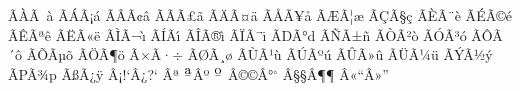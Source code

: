 \def\tura#1{{\edef\scf@{\the\scriptfont\fam}%
 \ifdim\fontdimen6\scf@=0pt\else\scf@\fi $^{\hbox{\b{#1}}}$}}

\ifx\ifmath\undefined
 \def\ifmath$#1${\relax\ifmmode #1\else$#1$\fi} %
\fi

\def\do#1#2{\expandafter\def
 \csname\string^^c2\string#1@tex\endcsname{\string#1}}\doutfA

\def\dotexA{%
 \do^^c3^^80{\`A}\do^^c3^^a0{\`a}%
 \do^^c3^^81{\'A}\do^^c3^^a1{\'a}%
 \do^^c3^^82{\^A}\do^^c3^^a2{\^a}%
 \do^^c3^^83{\~A}\do^^c3^^a3{\~a}%
 \do^^c3^^84{\"A}\do^^c3^^a4{\"a}%
 \do^^c3^^85{\AA}\do^^c3^^a5{\aa}%
 \do^^c3^^86{\AE}\do^^c3^^a6{\ae}%
 \do^^c3^^87{\c C}\do^^c3^^a7{\c c}%
 \do^^c3^^88{\`E}\do^^c3^^a8{\`e}%
 \do^^c3^^89{\'E}\do^^c3^^a9{\'e}%
 \do^^c3^^8a{\^E}\do^^c3^^aa{\^e}%
 \do^^c3^^8b{\"E}\do^^c3^^ab{\"e}%
 \do^^c3^^8c{\`I}\do^^c3^^ac{\`\i}%
 \do^^c3^^8d{\'I}\do^^c3^^ad{\'\i}%
 \do^^c3^^8e{\^I}\do^^c3^^ae{\^\i}%
 \do^^c3^^8f{\"I}\do^^c3^^af{\"\i}%
 \do^^c3^^90{D}\do^^c3^^b0{d}%
 \do^^c3^^91{\~N}\do^^c3^^b1{\~n}%
 \do^^c3^^92{\`O}\do^^c3^^b2{\`o}%
 \do^^c3^^93{\'O}\do^^c3^^b3{\'o}%
 \do^^c3^^94{\^O}\do^^c3^^b4{\^o}%
 \do^^c3^^95{\~O}\do^^c3^^b5{\~o}%
 \do^^c3^^96{\"O}\do^^c3^^b6{\"o}%
 \do^^c3^^97{\ifmath$\times$}\do^^c3^^b7{\ifmath$\div$}%
 \do^^c3^^98{\O}\do^^c3^^b8{\o}%
 \do^^c3^^99{\`U}\do^^c3^^b9{\`u}%
 \do^^c3^^9a{\'U}\do^^c3^^ba{\'u}%
 \do^^c3^^9b{\^U}\do^^c3^^bb{\^u}%
 \do^^c3^^9c{\"U}\do^^c3^^bc{\"u}%
 \do^^c3^^9d{\'Y}\do^^c3^^bd{\'y}
 \do^^c3^^9e{P}\do^^c3^^be{p}%
 \do^^c3^^9f{\ss}\do^^c3^^bf{\"y}%
 \do^^c2^^a1{!`}\do^^c2^^bf{?`}%
 \do^^c2^^aa{\tura a}\do^^c2^^ba{\tura o}%
 \do^^c2^^a9{\copyright}\do^^c2^^b0{$^\circ$}%
 \do^^c2^^a7{\S}\do^^c2^^b6{\P}%
 \do^^c2^^ab{``}\do^^c2^^bb{''}%
}

\def\do#1#2#3{\expandafter\def
 \csname\string#1\string#2@tex\endcsname{#3}}\dotexA

\def\doutfB{%
 \do^^e2^^80^^92%
 \do^^e2^^80^^93%
 \do^^e2^^80^^94%
 \do^^e2^^80^^98%
 \do^^e2^^80^^99%
 \do^^e2^^80^^9a%
 \do^^e2^^80^^9c%
 \do^^e2^^80^^9d%
 \do^^e2^^80^^9e%
 \do^^e2^^80^^a0%
 \do^^e2^^80^^a1%
 \do^^e2^^80^^a6%
 \do^^e2^^80^^b0%
 \do^^e2^^80^^b9%
 \do^^e2^^80^^ba%
 \do^^e2^^82^^ac%
}

